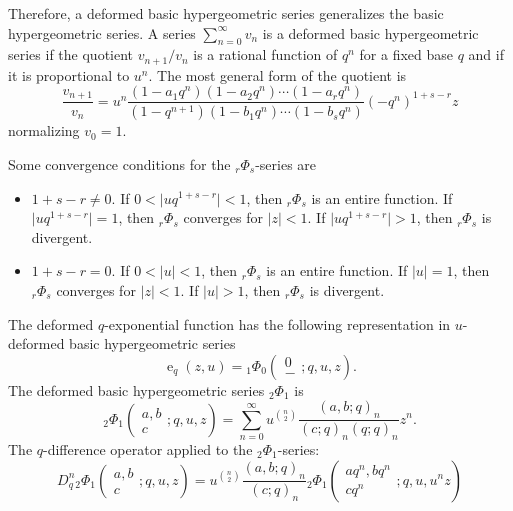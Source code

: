 \documentclass{cimart}
\DeclareMathOperator{\ope}{e}
\begin{document}
Therefore, a deformed basic hypergeometric series generalizes the basic hypergeometric series. A series $\sum_{n=0}^{\infty}v_{n}$ is a deformed basic hypergeometric series if the quotient $v_{n+1}/v_{n}$ is a rational function of $q^n$ for a fixed base $q$ and if it is proportional to $u^n$. The most general form of the quotient is
\begin{equation*}
    \frac{v_{n+1}}{v_{n}}=u^n\frac{(1-a_{1}q^n)(1-a_{2}q^n)\cdots(1-a_{r}q^n)}{(1-q^{n+1})(1-b_{1}q^n)\cdots(1-b_{s}q^n)}(-q^n)^{1+s-r}z
\end{equation*}
normalizing $v_{0}=1$.
\begin{theorem}
Some convergence conditions for the ${}_{r}\Phi_{s}$-series are
\begin{itemize}
    \item $1+s-r\neq0$. If $0<\vert uq^{1+s-r}\vert<1$, then ${}_{r}\Phi_{s}$ is an entire function. If $\vert uq^{1+s-r}\vert=1$, then ${}_{r}\Phi_{s}$ converges for $\vert z\vert<1$. If $\vert uq^{1+s-r}\vert>1$, then ${}_{r}\Phi_{s}$ is divergent.
    \item $1+s-r=0$. If $0<\vert u\vert<1$, then ${}_{r}\Phi_{s}$ is an entire function. If $\vert u\vert=1$, then ${}_{r}\Phi_{s}$ converges for $\vert z\vert<1$. If $\vert u\vert>1$, then ${}_{r}\Phi_{s}$ is divergent.
\end{itemize}
\end{theorem}
The deformed $q$-exponential function has the following representation in $u$-deformed basic hypergeometric series
\begin{equation}
    \ope_{q}(z,u)={}_{1}\Phi_{0}\left(
    \begin{array}{c}
         0 \\
         -
    \end{array}
    ;q,u,z    
    \right).
\end{equation}
The deformed basic hypergeometric series ${}_{2}\Phi_{1}$ is
\begin{equation}\label{eqn_def_he}
    {}_{2}\Phi_{1}\left(
    \begin{array}{c}
         a,b \\
         c
    \end{array}
    ;q,u,z \right)=\sum_{n=0}^{\infty}u^{\binom{n}{2}}\frac{(a,b;q)_{n}}{(c;q)_{n}(q;q)_{n}}z^n.
\end{equation}
The $q$-difference operator applied to the ${}_{2}\Phi_{1}$-series:
\begin{equation}
    D_{q}^n{}_{2}\Phi_{1}\left(
    \begin{array}{c}
         a,b \\
         c
    \end{array}
    ;q,u,z    
    \right)=u^{\binom{n}{2}}\frac{(a,b;q)_{n}}{(c;q)_{n}}{}_{2}\Phi_{1}\left(
    \begin{array}{c}
         aq^n,bq^n \\
         cq^n
    \end{array}
    ;q,u,u^nz    
    \right)
\end{equation}
\end{document}

